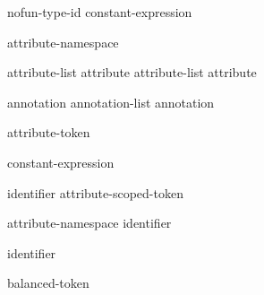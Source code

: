 \begin{bnf}
\br
   \terminal{(} nofun-type-id  \terminal{)}\br
   \terminal{(} constant-expression  \terminal{)}
\end{bnf}

\begin{bnf}
\br
   attribute-namespace \terminal{:}
\end{bnf}

\begin{bnf}
\br
  \br
  attribute-list \terminal{,} \br
  attribute \br
  attribute-list \terminal{,} attribute 
\end{bnf}

\begin{bnf}
\br
  annotation \br
  annotation-list \terminal{,} annotation 
\end{bnf}

\begin{bnf}
\br
    attribute-token 
\end{bnf}

\begin{bnf}
\br
    \terminal{=} constant-expression
\end{bnf}

\begin{bnf}
\br
    identifier\br
    attribute-scoped-token
\end{bnf}

\begin{bnf}
\br
    attribute-namespace \terminal{::} identifier
\end{bnf}

\begin{bnf}
\br
    identifier
\end{bnf}

\begin{bnf}
\br
    \terminal{(}  \terminal{)}
\end{bnf}

\begin{bnf}
\br
    balanced-token 
\end{bnf}

